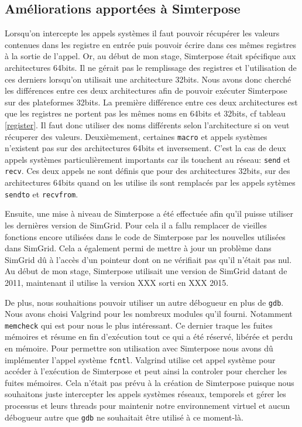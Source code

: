 \subsection{Améliorations apportées à Simterpose}

Lorsqu'on intercepte les appels systèmes il faut pouvoir récupérer les valeurs contenues dans les registre en entrée puis pouvoir écrire dans ces mêmes registres à la sortie de l'appel. Or, au début de mon stage, Simterpose était spécifique aux architectures 64bits. Il ne gérait pas le remplissage des registres et l'utilisation de ces derniers lorsqu'on utilisait une architecture 32bits. Nous avons donc cherché les différences entre ces deux architectures afin de pouvoir exécuter Simterpose sur des plateformes 32bits. La première différence entre ces deux architectures est que les registres ne portent pas les mêmes noms en 64bits et 32bits, cf tableau \ref{register}. Il faut donc utiliser des noms différents selon l'architecture si on veut récuperer des valeurs. Deuxièmement, certaines \texttt{macro} et appels systèmes n'existent pas sur des architectures 64bits et inversement. C'est la cas de deux appels systèmes particulièrement importants car ils touchent au réseau: \texttt{send} et \texttt{recv}. Ces deux appels ne sont définis que pour des architectures 32bits, sur des architectures 64bits quand on les utilise ils sont remplacés par les appels sytèmes \texttt{sendto} et \texttt{recvfrom}.

Ensuite, une mise à niveau de Simterpose a été effectuée afin qu'il puisse utiliser les dernières version de SimGrid. Pour cela il a fallu remplacer de vieilles fonctions encore utilisées dans le code de Simterpose par les nouvelles utilisées dans SimGrid. Cela a également permi de mettre à jour un problème dans SimGrid dû à l'accès d'un pointeur dont on ne vérifiait pas qu'il n'était pas nul. Au début de mon stage, Simterpose utilisait une version de SimGrid datant de 2011, maintenant il utilise la version  {\color{red}XXX} sorti en {\color{red}XXX} 2015.

De plus, nous souhaitions pouvoir utiliser un autre {\color{red}débogueur} en plus de \texttt{gdb}. Nous avons choisi Valgrind pour les nombreux modules qu'il fourni. Notamment \texttt{memcheck} qui est pour nous le plus intéressant. Ce dernier traque les fuites mémoires et résume en fin d'exécution tout ce qui a été réservé, libérée et perdu en mémoire. Pour permettre son utilisation avec Simterpose nous avons dû implémenter l'appel système \texttt{fcntl}. Valgrind utilise cet appel système pour accéder à l'exécution de Simterpose et peut ainsi la controler pour chercher les fuites mémoires. Cela n'était pas prévu à la création de Simterpose puisque nous souhaitons juste intercepter les appels systèmes réseaux, temporels et gérer les processus et leurs threads pour maintenir notre environnement virtuel et aucun  {\color{red}débogueur} autre que \texttt{gdb} ne souhaitait être utilisé à ce moment-là.

